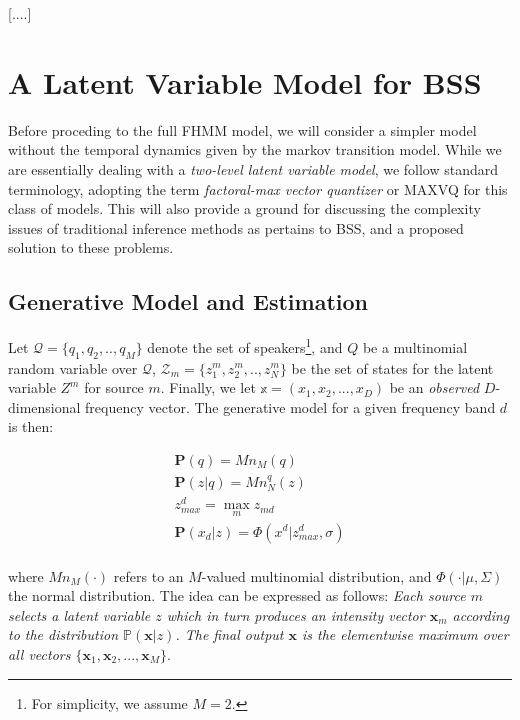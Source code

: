 \documentclass[11pt, oneside, a4paper]{report}
\begin{document}
[....]

\section{A Latent Variable Model for BSS}

Before proceding to the full FHMM model, we will consider a simpler model without the temporal dynamics given by the markov transition model. While we are essentially dealing with a \emph{two-level latent variable model}, we follow standard terminology, adopting the term \emph{factoral-max vector quantizer} or MAXVQ for this class of models. This will also provide a ground for discussing the complexity issues of traditional inference methods as pertains to BSS, and a proposed solution to these problems.

\subsection{Generative Model and Estimation}

Let $\mathcal{Q} = \{q_1, q_2, .. , q_M\}$ denote the set of speakers\footnote{For simplicity, we assume $M=2$.}, and $Q$ be a multinomial random variable over $\mathcal{Q}$, $\mathcal{Z}_m  = \{z_1^m, z_2^m, .. , z_N^m\}$ be the set of states for the latent variable $Z^m$ for source $m$. Finally, we let $\mathbb{x} = (x_1,x_2,...,x_D)$ be an \emph{observed} $D$-dimensional frequency vector. The generative model for a given frequency band $d$ is then:

\begin{equation}
  \label{maxvq_eqn}
  \begin{array}{lcl}
    \mathbf{P}(q)   = Mn_M(q) \\
    \mathbf{P}(z|q) = Mn_N^q(z) \\ 
    z^d_{max} = \max_mz_{md} \\
    \mathbf{P}(x_d|z) = \Phi(x^d|z^d_{max},\sigma) \\
  \end{array}
\end{equation}

where $Mn_M(\cdot)$ refers to an $M$-valued multinomial distribution, and $\Phi(\cdot|\mu,\Sigma)$ the normal distribution. The idea can be expressed as follows: \emph{Each source $m$ selects a latent variable $z$ which in turn produces an intensity vector $\mathbf{x}_m$ according to the distribution $\mathbb{P}(\mathbf{x}|z)$. The final output $\mathbf{x}$ is the elementwise maximum over all vectors $\{\mathbf{x}_1, \mathbf{x}_2, ..., \mathbf{x}_M\}$}.
\end{document}
